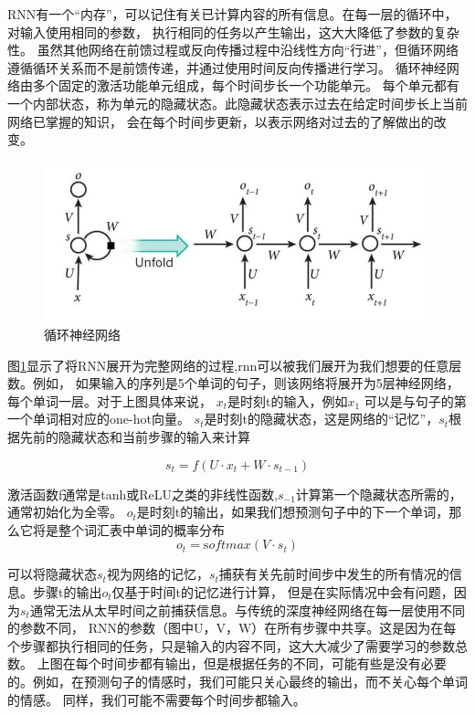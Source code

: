 RNN有一个“内存”，可以记住有关已计算内容的所有信息。在每一层的循环中，对输入使用相同的参数，
执行相同的任务以产生输出，这大大降低了参数的复杂性\cite{liu2016recurrent}。
虽然其他网络在前馈过程或反向传播过程中沿线性方向“行进”，但循环网络遵循循环关系而不是前馈传递，并通过使用时间反向传播进行学习。
循环神经网络由多个固定的激活功能单元组成，每个时间步长一个功能单元。
每个单元都有一个内部状态，称为单元的隐藏状态。此隐藏状态表示过去在给定时间步长上当前网络已掌握的知识，
会在每个时间步更新，以表示网络对过去的了解做出的改变。

\begin{figure}[htbp]
  \centering
  \includegraphics[scale=0.5]{./images/rnn.jpg}
  \caption{循环神经网络}
  \label{fig:rnn}
\end{figure}

图\ref{fig:rnn}显示了将RNN展开为完整网络的过程,rnn可以被我们展开为我们想要的任意层数。例如，
如果输入的序列是5个单词的句子，则该网络将展开为5层神经网络，每个单词一层。对于上图具体来说，
$x_{t}$是时刻t的输入，例如$x_{1}$ 可以是与句子的第一个单词相对应的one-hot向量。
$s_{t}$是时刻t的隐藏状态，这是网络的“记忆”，$s_{t}$根据先前的隐藏状态和当前步骤的输入来计算

\begin{equation}
  s_{t}=f(U \cdot x_{t}+W \cdot s_{t-1})
  \end{equation}

激活函数f通常是tanh或ReLU之类的非线性函数,$s_{-1}$计算第一个隐藏状态所需的，通常初始化为全零。
$o_{t}$是时刻t的输出，如果我们想预测句子中的下一个单词，那么它将是整个词汇表中单词的概率分布
\begin{equation}
  o_t = \mathrm softmax (V \cdot s_t)
  \end{equation}

  可以将隐藏状态$s_{t}$视为网络的记忆，$s_{t}$捕获有关先前时间步中发生的所有情况的信息。步骤t的输出$o_{t}$仅基于时间t的记忆进行计算，
  但是在实际情况中会有问题，因为$s_{t}$通常无法从太早时间之前捕获信息。与传统的深度神经网络在每一层使用不同的参数不同，
  RNN的参数（图中U，V，W）在所有步骤中共享。这是因为在每个步骤都执行相同的任务，只是输入的内容不同，这大大减少了需要学习的参数总数。
  上图在每个时间步都有输出，但是根据任务的不同，可能有些是没有必要的。例如，在预测句子的情感时，我们可能只关心最终的输出，而不关心每个单词的情感。
  同样，我们可能不需要每个时间步都输入。

